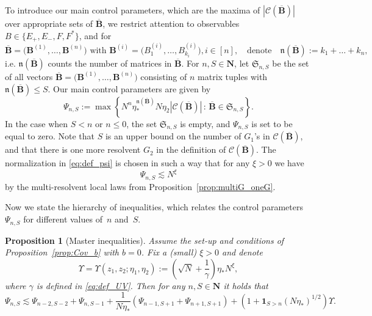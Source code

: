 \documentclass[10pt]{amsart}
\newtheorem{proposition}[theorem]{Proposition}
\numberwithin{equation}{section}
\newcommand{\N}{\mathbf{N}}
\begin{document}
To introduce our main control parameters, which are the maxima of $|\mathcal{C}(\overline{\bm{B}})|$ over appropriate sets of $\overline{\bm{B}}$, we restrict attention to observables $B\in\{E_+,E_-,F,F^*\}$, and for
\begin{equation}
\overline{\bm{B}}= \big(\bm{B}^{(1)},\ldots, \bm{B}^{(n)}\big)\,\,\text{with}\,\, \bm{B}^{(i)}=\big(B^{(i)}_1,\ldots, B^{(i)}_{k_i}\big),i\in[n],\quad\text{denote}\quad \mathfrak{n}(\overline{\bm{B}}):=k_1+\ldots+k_n,
\end{equation}
i.e. $\mathfrak{n}(\overline{\bm{B}})$ counts the number of matrices in $\overline{\bm{B}}$. For $n,S\in\N$, let $\mathfrak{S}_{n,S}$ be the set of all vectors $\overline{\bm{B}} = \big(\bm{B}^{(1)},\ldots, \bm{B}^{(n)}\big)$ consisting of $n$ matrix tuples with $\mathfrak{n}(\overline{\bm{B}})\le S$. Our main control parameters are given by
\begin{equation}
\Psi_{n,S}:=\max \left\lbrace N^n\eta_*^{\mathfrak{n}(\overline{\bm{B}})}N\eta_2\left\vert \mathcal{C}\left(\overline{\bm{B}}\right)\right\vert\,:\,\overline{\bm{B}}\in \mathfrak{S}_{n,S}\right\rbrace.
\label{eq:def_psi}
\end{equation}
In the case when $S<n$ or $n\le 0$, the set $\mathfrak{S}_{n,S}$ is empty, and $\Psi_{n,S}$ is set to be equal to zero. Note that $S$ is an upper bound on the number of $G_1$'s in $\mathcal{C}(\overline{\bm{B}})$, and that there is one more resolvent $G_2$ in the definition of $\mathcal{C}(\overline{\bm{B}})$. The normalization in \eqref{eq:def_psi} is chosen in such a way that for any $\xi>0$ we have
\begin{equation}
\Psi_{n,S}\lesssim N^\xi
\label{eq:psi_a_priori}
\end{equation} 
by the multi-resolvent local laws from Proposition~\ref{prop:multiG_oneG}.

Now we state the hierarchy of inequalities, which relates the control parameters $\Psi_{n,S}$ for different values of~$n$ and~$S$.

\begin{proposition}[Master inequalities]\label{prop:master_av} Assume the set-up and conditions of Proposition~\ref{prop:Cov_b} with $b=0$. Fix a (small) $\xi>0$ and denote
\begin{equation}
\Upsilon=\Upsilon(z_1,z_2;\eta_1,\eta_2):=\left(\sqrt{N}+\frac{1}{\gamma}\right)\eta_*N^\xi,
\label{eq:def_Upsilon}
\end{equation}
where $\gamma$ is defined in \eqref{eq:def_UV}. Then for any $n,S\in\N$ it holds that
\begin{equation}
\Psi_{n,S}\lesssim \Psi_{n-2,S-2} + \Psi_{n,S-1}+\frac{1}{N\eta_*}\left(\Psi_{n-1,S+1}+\Psi_{n+1,S+1}\right) + \left(1+\bm{1}_{S>n}(N\eta_*)^{1/2}\right)\Upsilon.\label{eq:master_S}
\end{equation}
\end{proposition}
\end{document}

